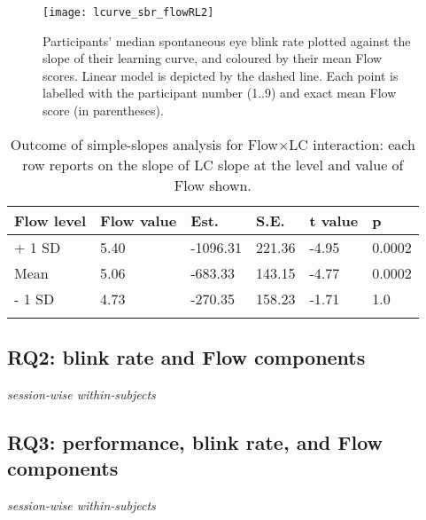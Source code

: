 \begin{figure*}[!ht]
	\centering
	\texttt{[image: lcurve\_sbr\_flowRL2]}
	\caption{Participants' median spontaneous eye blink rate plotted against the slope of their learning curve, and coloured by their mean Flow scores. Linear model is depicted by the dashed line. Each point is labelled with the participant number (1..9) and exact mean Flow score (in parentheses).}
	\label{fig:EBRvLC}
\end{figure*}



\begin{table}[!hb]
\centering
\caption{Outcome of simple-slopes analysis for Flow$\times$LC interaction: each row reports on the slope of LC slope at the level and value of Flow shown.}
\begin{tabular}{llllll}
\hline
Flow level & Flow value & Est. & S.E. & t value & p \\
\hline
+ 1 SD & 5.40 & -1096.31 & 221.36 & -4.95 & 0.0002 \\
Mean   & 5.06 &  -683.33 & 143.15 & -4.77 & 0.0002 \\
- 1 SD & 4.73 &  -270.35 & 158.23 & -1.71 & 1.0 \\
\hline
\label{tab:simpslopes}
\end{tabular}
\end{table}

%

\subsection*{RQ2: blink rate and Flow components}
{\it session-wise within-subjects}

\subsection*{RQ3: performance, blink rate, and Flow components}
{\it session-wise within-subjects}
